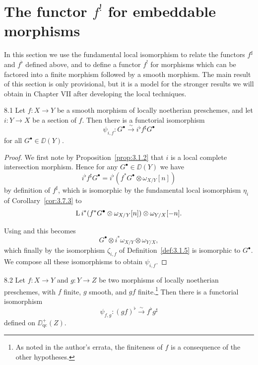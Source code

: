 \section{The functor \texorpdfstring{$f^!$}{f!} for embeddable morphisms}\label{sec:3.8}

In this section we use the fundamental local isomorphism to relate the functors $f^{\sharp}$ and $f^{\flat}$ defined above, and to define a functor $f^!$ for morphisms which can be factored into a finite morphism followed by a smooth morphism. The main result of this section is only provisional, but it is a model for the stronger results we will obtain in Chapter VII after developing the local techniques.

\begin{booklemma}{8.1}\label{lem:3.8.1}
Let $f\colon X\to Y$ be a smooth morphism of locally noetherian preschemes, and let $i\colon Y\to X$ be a section of $f$. Then there is a functorial isomorphism
\[
\psi_{i,f}\colon G^\bullet \xrightarrow{\sim} i^{\flat}f^{\sharp}G^\bullet
\]
for all $G^\bullet\in\DD(Y)$.
\end{booklemma}

\begin{proof}
We first note by Proposition~\ref{prop:3.1.2} that $i$ is a local complete intersection morphism. Hence for any $G^\bullet\in\DD(Y)$ we have
\[
i^{\flat}f^{\sharp}G^\bullet = i^{\flat}(f^*G^\bullet\otimes\omega_{X/Y}[n])
\]
by definition of $f^{\sharp}$, which is isomorphic by the fundamental local isomorphism $\eta_i$ of Corollary~\ref{cor:3.7.3} to
\[
\operatorname{L} i^*(f^*G^\bullet\otimes\omega_{X/Y}[n])\otimes\omega_{Y/X}[-n].
\]

Using  and  this becomes
\[
G^\bullet \otimes i^*\omega_{X/Y}\otimes\omega_{Y/X},
\]
which finally by the isomorphism $\zeta_{i,f}$ of Definition~\ref{def:3.1.5} is isomorphic to $G^\bullet$. We compose all these isomorphisms to obtain $\psi_{i,f}$.
\end{proof}

\begin{bookproposition}{8.2}\label{prop:3.8.2}
Let $f\colon X\to Y$ and $g\colon Y\to Z$ be two morphisms of locally noetherian preschemes, with $f$ finite, $g$ smooth, and $gf$ finite.\footnote{As noted in the author's errata, the finiteness of $f$ is a consequence of the other hypotheses.} Then there is a functorial isomorphism
\[
\psi_{f,g}\colon (gf)^{\flat} \xrightarrow{\sim} f^{\flat}g^{\sharp}
\]
defined on $\DD_{\mathrm{qc}}^+(Z)$.
\end{bookproposition}

